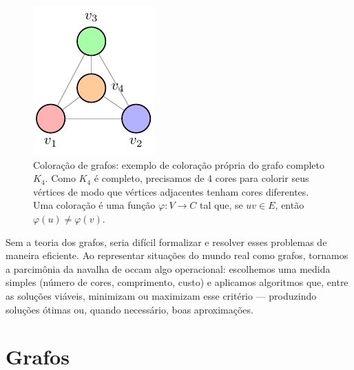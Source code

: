 \begin{figure}[H]
	\centering
	\includegraphics[width=0.9\linewidth]{figures/fig_coloracao.pdf}

	\caption{Coloração de grafos: exemplo de coloração própria do grafo completo $K_4$. Como $K_4$ é completo, precisamos de 4 cores para colorir seus vértices de modo que vértices adjacentes tenham cores diferentes. Uma coloração é uma função $\varphi:V\to C$ tal que, se $uv\in E$, então $\varphi(u)\neq\varphi(v)$.}
	\label{fig:coloracao}\end{figure}



Sem a teoria dos grafos, seria difícil formalizar e resolver esses problemas de maneira eficiente. Ao representar situações do mundo real como grafos, tornamos a parcimônia da navalha de occam algo operacional: escolhemos uma medida simples (número de cores, comprimento, custo) e aplicamos algoritmos que, entre as soluções viáveis, minimizam ou maximizam esse critério — produzindo soluções ótimas ou, quando necessário, boas aproximações.

\section{Grafos}

